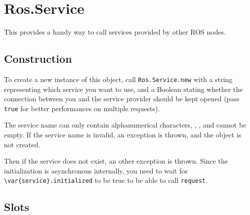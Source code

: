 \section{Ros.Service}

This \UObject provides a handy way to call services provided by other ROS
nodes.


\subsection{Construction}

To create a new instance of this object, call \lstinline{Ros.Service.new}
with a string representing which service you want to use, and a Boolean
stating whether the connection between you and the service provider should
be kept opened (pass \lstinline{true} for better performances on multiple
requests).

The service name can only contain alphanumerical characters, \samp{/},
\samp{\_}, and cannot be empty. If the service name is invalid, an exception
is thrown, and the object is not created.

Then if the service does not exist, an other exception is thrown. Since the
initialization is asynchronous internally, you need to wait for
\lstinline|\var{service}.initialized| to be true to be able to call
\lstinline{request}.


\subsection{Slots}

